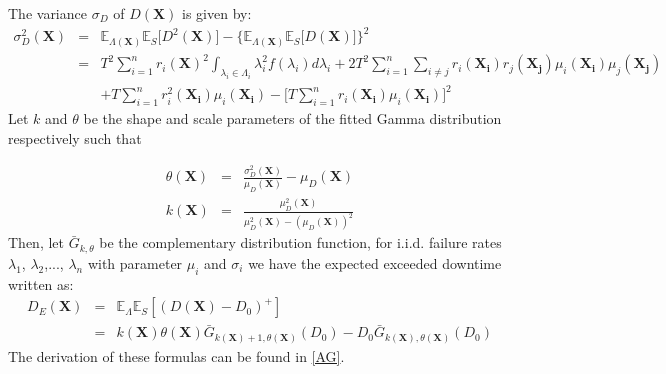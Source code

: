 \documentclass[preprint,12pt]{elsarticle}
\begin{document}
The variance $\sigma_{D}$ of $D(\boldsymbol{X})$ is given by:
\begin{eqnarray}
\sigma^{2}_{D}(\boldsymbol{X})&=&\mathbb{E}_{\Lambda(\boldsymbol{X})}\mathbb{E}_{S} \bigg[D^{2}(\boldsymbol{X}) \bigg]- \bigg\{\mathbb{E}_{\Lambda(\boldsymbol{X})}\mathbb{E}_{S}\bigg[D(\boldsymbol{X}) \bigg] \bigg\}^{2} \nonumber\\
&=&T^{2}\sum_{i=1}^{n}r_{i}(\boldsymbol{X})^{2}\int_{\lambda_{i}\in\Lambda_{i}}{\lambda_{i}^{2}f(\lambda_{i})d\lambda_{i}}+2T^{2}\sum_{i=1}^{n}\sum_{i\ne j}{r_{i}(\boldsymbol{X_{i}})r_{j}(\boldsymbol{X_{j}})\mu_{i}(\boldsymbol{X_{i}})\mu_{j}(\boldsymbol{X_{j}})} \nonumber\\
&&+T\sum_{i=1}^{n}{r_{i}^{2}(\boldsymbol{X_{i}})\mu_{i}(\boldsymbol{X_{i}})}-\bigg[T\sum_{i=1}^{n}{r_{i}(\boldsymbol{X_i})\mu_{i}(\boldsymbol{X_i})}\bigg]^{2}
\end{eqnarray}
Let $k$ and $\theta$ be the shape and scale parameters of the fitted Gamma distribution respectively such that

\begin{eqnarray}
 \theta(\boldsymbol{X}) &=& \frac{\sigma^{2}_{D}(\boldsymbol{X})}{\mu_{D}(\boldsymbol{X})}-\mu_{D}(\boldsymbol{X})  \\
 k(\boldsymbol{X}) &=& \frac{\mu^{2}_{D}(\boldsymbol{X})}{\mu^{2}_{D}(\boldsymbol{X})-(\mu_{D}(\boldsymbol{X}))^{2}}
\end{eqnarray}
 Then, let $\bar{G}_{k,\theta}$ be the complementary distribution function, for i.i.d. failure rates $\lambda_{1}$, $\lambda_{2}$,..., $\lambda_{n}$ with parameter $\mu_{i}$ and $\sigma_{i}$ we have the expected exceeded downtime written as:
\begin{eqnarray}
D_{E}(\boldsymbol{X})&=& \mathbb{E}_{\Lambda}\mathbb{E}_{S}{[(D(\boldsymbol{X})-D_{0})^{+}]} \nonumber\\
&=&k(\boldsymbol{X})\theta(\boldsymbol{X}) \bar{G}_{k(\boldsymbol{X})+1,\theta(\boldsymbol{X})}(D_{0}) - D_{0}\bar{G}_{k(\boldsymbol{X}),\theta(\boldsymbol{X})}(D_{0})
\label{EXD}
\end{eqnarray}
The derivation of these formulas can be found in \ref{AG}.
\end{document}
